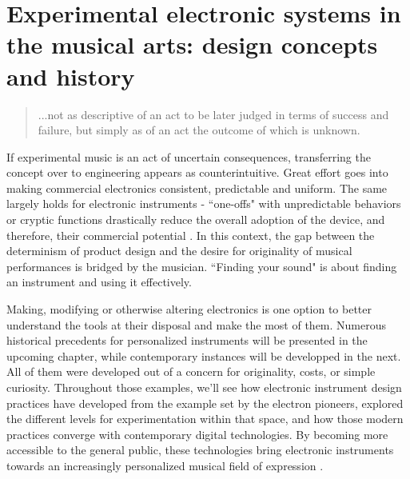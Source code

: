 \chapter{Experimental electronic systems in the musical arts: design concepts and history}\label{background}
\begin{quote}
	
	...not as descriptive of an act to be later judged in terms of success and failure, but simply as of an act the outcome of which is unknown. 
	
	\cite[p.13]{cage1961}
	
	\end{quote}
	
If experimental music is an act of uncertain consequences, transferring the concept over to engineering appears as counterintuitive. Great effort goes into making commercial electronics consistent, predictable and uniform. The same largely holds for electronic instruments - ``one-offs" with unpredictable behaviors or cryptic functions drastically reduce the overall adoption of the device, and therefore, their commercial potential \cite[p.5]{haslett2005}. In this context, the gap between the determinism of product design and the desire for originality of musical performances is bridged by the musician. ``Finding your sound" is about finding an instrument and using it effectively.  

Making, modifying or otherwise altering electronics is one option to better understand the tools at their disposal and make the most of them. Numerous historical precedents for personalized instruments will be presented in the upcoming chapter, while contemporary instances will be developped in the next. All of them were developed out of a concern for originality, costs, or simple curiosity. Throughout those examples, we'll see how electronic instrument design practices have developed from the example set by the electron pioneers, explored the different levels for experimentation within that space, and how those modern practices converge with contemporary digital technologies. By becoming more accessible to the general public, these technologies bring electronic instruments towards an increasingly personalized musical field of expression \citep{hermans2014}.

